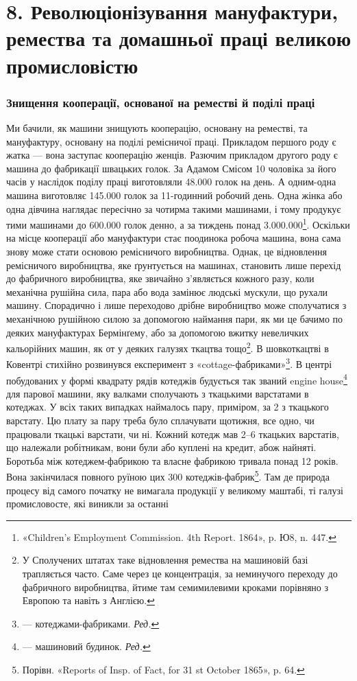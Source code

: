 \section*{8. Революціонізування мануфактури, ремества та домашньої
праці великою промисловістю}

\subsubsection{Знищення кооперації, основаної
на реместві й поділі праці}

Ми бачили, як машини знищують кооперацію, основану на
реместві, та мануфактуру, основану на поділі ремісничої
праці. Прикладом першого роду є жатка — вона заступає кооперацію
женців. Разючим прикладом другого роду є машина до
фабрикації швацьких голок. За Адамом Смісом 10 чоловіка за
його часів у наслідок поділу праці виготовляли \num{48.000} голок на
день. А одним-одна машина виготовляє \num{145.000} голок за 11-годинний
робочий день. Одна жінка або одна дівчина наглядає
пересічно за чотирма такими машинами, і тому продукує тими
машинами до \num{600.000} голок денно, а за тиждень понад \num{3.000.000}\footnote{
«Children’s Employment Commission. 4th Report. 1864», p. Ю8,
n. 447.
}.
Оскільки на місце кооперації або мануфактури стає поодинока
робоча машина, вона сама знову може стати основою ремісничого
виробництва. Однак, це відновлення ремісничого виробництва,
яке ґрунтується на машинах, становить лише перехід до фабричного
виробництва, яке звичайно з’являється кожного разу, коли
механічна рушійна сила, пара або вода замінює людські мускули,
що рухали машину. Спорадично і лише переходово дрібне виробництво
може сполучатися з механічною рушійною силою за
допомогою наймання пари, як ми це бачимо по деяких мануфактурах
Бермінґему, або за допомогою вжитку невеличких кальорійних
машин, як от у деяких галузях ткацтва тощо\footnote{
У Сполучених штатах таке відновлення ремества на машиновій
базі трапляється часто. Саме через це концентрація, за неминучого переходу
до фабричного виробництва, йтиме там семимилевими кроками порівняно
з Европою та навіть з Англією.
}. В шовкоткацтві в Ковентрі стихійно розвинувся експеримент з
«cottage-фабриками»\footnote*{
— котеджами-фабриками. \emph{Ред.}
}.
В центрі побудованих у формі квадрату рядів котеджів
будується так званий engine house\footnote*{
— машиновий будинок. \emph{Ред.}
} для парової машини, яку валками сполучають з ткацькими варстатами в котеджах.
У всіх таких випадках наймалось пару, приміром, за 2
з ткацького варстату. Цю плату за пару треба було сплачувати
щотижня, все одно, чи працювали ткацькі варстати, чи ні. Кожний
котедж мав 2--6 ткацьких варстатів, що належали робітникам,
вони були або куплені на кредит, абож найняті. Боротьба між
котеджем-фабрикою та власне фабрикою тривала понад 12 років.
Вона закінчилася повного руїною цих 300 котеджів-фабрик\footnote{
Порівн. «Reports of Insp. of Fact, for 31 st October 1865», p. 64.
}. Там де природа процесу від самого початку не вимагала продукції у великому
маштабі, ті галузі промисловосте, які виникли за останні
\parbreak{}  %

